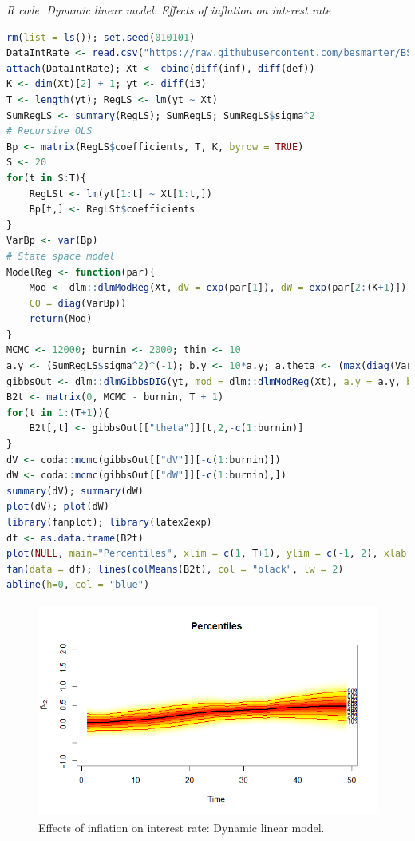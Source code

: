 \begin{tcolorbox}[enhanced,width=4.67in,center upper,
	fontupper=\large\bfseries,drop shadow southwest,sharp corners]
	\textit{R code. Dynamic linear model: Effects of inflation on interest rate}
	\begin{VF}
		\begin{lstlisting}[language=R]
rm(list = ls()); set.seed(010101)
DataIntRate <- read.csv("https://raw.githubusercontent.com/besmarter/BSTApp/refs/heads/master/DataApp/16INTDEF.csv", sep = ",", header = TRUE, quote = "")
attach(DataIntRate); Xt <- cbind(diff(inf), diff(def))
K <- dim(Xt)[2] + 1; yt <- diff(i3)
T <- length(yt); RegLS <- lm(yt ~ Xt)
SumRegLS <- summary(RegLS); SumRegLS; SumRegLS$sigma^2  
# Recursive OLS
Bp <- matrix(RegLS$coefficients, T, K, byrow = TRUE)
S <- 20
for(t in S:T){
	RegLSt <- lm(yt[1:t] ~ Xt[1:t,])
	Bp[t,] <- RegLSt$coefficients 
}
VarBp <- var(Bp)
# State space model
ModelReg <- function(par){
	Mod <- dlm::dlmModReg(Xt, dV = exp(par[1]), dW = exp(par[2:(K+1)]), m0 = RegLS$coefficients,
	C0 = diag(VarBp))
	return(Mod)
}
MCMC <- 12000; burnin <- 2000; thin <- 10
a.y <- (SumRegLS$sigma^2)^(-1); b.y <- 10*a.y; a.theta <- (max(diag(VarBp)))^(-1); b.theta <- 10*a.theta 
gibbsOut <- dlm::dlmGibbsDIG(yt, mod = dlm::dlmModReg(Xt), a.y = a.y, b.y = b.y, a.theta = a.theta, b.theta = b.theta, n.sample = MCMC, thin = 5, save.states = TRUE)
B2t <- matrix(0, MCMC - burnin, T + 1)
for(t in 1:(T+1)){
	B2t[,t] <- gibbsOut[["theta"]][t,2,-c(1:burnin)] 
}
dV <- coda::mcmc(gibbsOut[["dV"]][-c(1:burnin)])
dW <- coda::mcmc(gibbsOut[["dW"]][-c(1:burnin),])
summary(dV); summary(dW)
plot(dV); plot(dW)
library(fanplot); library(latex2exp)
df <- as.data.frame(B2t)
plot(NULL, main="Percentiles", xlim = c(1, T+1), ylim = c(-1, 2), xlab = "Time", ylab = TeX("$\\beta_{t1}$"))
fan(data = df); lines(colMeans(B2t), col = "black", lw = 2)
abline(h=0, col = "blue")
\end{lstlisting}
	\end{VF}
\end{tcolorbox}

\begin{figure}[!h]
	\includegraphics[width=340pt, height=200pt]{Chapters/chapter8/figures/IntInf.png}
	\caption[List of figure caption goes here]{Effects of inflation on interest rate: Dynamic linear model.}\label{fig2}
\end{figure}


